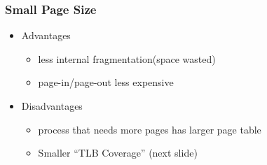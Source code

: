 \documentclass[12pt]{article}
\begin{document}
\subsubsection{Small Page Size}
\begin{itemize}
    \item Advantages \begin{itemize}
        \item less internal fragmentation(space wasted)
        \item page-in/page-out less expensive
    \end{itemize}
    \item Disadvantages \begin{itemize}
        \item process that needs more pages has larger page table
        \item Smaller “TLB Coverage” (next slide)
    \end{itemize}
\end{itemize}
\end{document}
